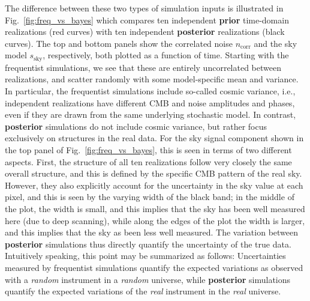 \documentclass[twocolumn]{aa}%
\begin{document}
The difference between these two types of simulation inputs is
illustrated in Fig.~\ref{fig:freq_vs_bayes} which compares ten
independent {\bf prior} time-domain realizations (red curves) with ten
independent {\bf posterior} realizations (black curves). The top and bottom
panels show the correlated noise $n_\mathrm{corr}$ and the sky model
$s_\mathrm{sky}$, respectively, both plotted as a function of
time. Starting with the frequentist simulations, we see that these are
entirely uncorrelated between realizations, and scatter randomly with
some model-specific mean and variance. In particular, the frequentist
simulations include so-called cosmic variance, i.e., independent
realizations have different CMB and noise amplitudes and phases, even
if they are drawn from the same underlying stochastic model. In
contrast, {\bf posterior} simulations do not include cosmic variance, but
rather focus exclusively on structures in the real data. For the sky
signal component shown in the top panel of
Fig.~\ref{fig:freq_vs_bayes}, this is seen in terms of two different
aspects. First, the structure of all ten realizations follow very
closely the same overall structure, and this is defined by the
specific CMB pattern of the real sky. However, they also explicitly
account for the uncertainty in the sky value at each pixel, and this
is seen by the varying width of the black band; in the middle of the
plot, the width is small, and this implies that the sky has been well
measured here (due to deep scanning), while along the edges of the
plot the width is larger, and this implies that the sky as been less
well measured. The variation between {\bf posterior} simulations thus
directly quantify the uncertainty of the true data. Intuitively
speaking, this point may be summarized as follows: Uncertainties
measured by frequentist simulations quantify the expected variations
as observed with a \emph{random} instrument in a \emph{random}
universe, while {\bf posterior} simulations quantify the expected variations
of the \emph{real} instrument in the \emph{real} universe.
\end{document}
